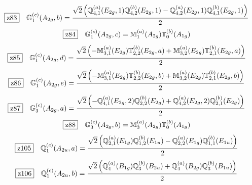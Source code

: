 \documentclass[fleqn,10pt,landscape]{jsarticle}
\begin{document}
\begin{dmath*}
\hspace*{3mm}\fbox{z83}\quad \mathbb{G}_{1}^{(c)}(A_{2g},b)=\frac{\sqrt{2} \left(\mathbb{Q}_{4,1}^{(a)}(E_{2g},1) \mathbb{Q}_{4,2}^{(b)}(E_{2g},1) - \mathbb{Q}_{4,2}^{(a)}(E_{2g},1) \mathbb{Q}_{4,1}^{(b)}(E_{2g},1)\right)}{2}
\end{dmath*}
\begin{dmath*}
\hspace*{3mm}\fbox{z84}\quad \mathbb{G}_{1}^{(c)}(A_{2g},c)=\mathbb{M}_{1}^{(a)}(A_{2g}) \mathbb{T}_{0}^{(b)}(A_{1g})
\end{dmath*}
\begin{dmath*}
\hspace*{3mm}\fbox{z85}\quad \mathbb{G}_{1}^{(c)}(A_{2g},d)=\frac{\sqrt{2} \left(- \mathbb{M}_{3,1}^{(a)}(E_{2g}) \mathbb{T}_{2,2}^{(b)}(E_{2g},a) + \mathbb{M}_{3,2}^{(a)}(E_{2g}) \mathbb{T}_{2,1}^{(b)}(E_{2g},a)\right)}{2}
\end{dmath*}
\begin{dmath*}
\hspace*{3mm}\fbox{z86}\quad \mathbb{G}_{1}^{(c)}(A_{2g},e)=\frac{\sqrt{2} \left(- \mathbb{M}_{3,1}^{(a)}(E_{2g}) \mathbb{T}_{2,2}^{(b)}(E_{2g},b) + \mathbb{M}_{3,2}^{(a)}(E_{2g}) \mathbb{T}_{2,1}^{(b)}(E_{2g},b)\right)}{2}
\end{dmath*}
\begin{dmath*}
\hspace*{3mm}\fbox{z87}\quad \mathbb{G}_{3}^{(c)}(A_{2g},a)=\frac{\sqrt{2} \left(- \mathbb{Q}_{4,1}^{(a)}(E_{2g},2) \mathbb{Q}_{2,2}^{(b)}(E_{2g}) + \mathbb{Q}_{4,2}^{(a)}(E_{2g},2) \mathbb{Q}_{2,1}^{(b)}(E_{2g})\right)}{2}
\end{dmath*}
\begin{dmath*}
\hspace*{3mm}\fbox{z88}\quad \mathbb{G}_{3}^{(c)}(A_{2g},b)=\mathbb{M}_{3}^{(a)}(A_{2g}) \mathbb{T}_{0}^{(b)}(A_{1g})
\end{dmath*}
\begin{dmath*}
\hspace*{3mm}\fbox{z105}\quad \mathbb{Q}_{1}^{(c)}(A_{2u},a)=\frac{\sqrt{2} \left(\mathbb{Q}_{2,1}^{(a)}(E_{1g}) \mathbb{Q}_{1,2}^{(b)}(E_{1u}) - \mathbb{Q}_{2,2}^{(a)}(E_{1g}) \mathbb{Q}_{1,1}^{(b)}(E_{1u})\right)}{2}
\end{dmath*}
\begin{dmath*}
\hspace*{3mm}\fbox{z106}\quad \mathbb{Q}_{1}^{(c)}(A_{2u},b)=\frac{\sqrt{2} \left(\mathbb{Q}_{4}^{(a)}(B_{1g}) \mathbb{Q}_{3}^{(b)}(B_{2u}) + \mathbb{Q}_{4}^{(a)}(B_{2g}) \mathbb{Q}_{3}^{(b)}(B_{1u})\right)}{2}
\end{dmath*}
\end{document}
